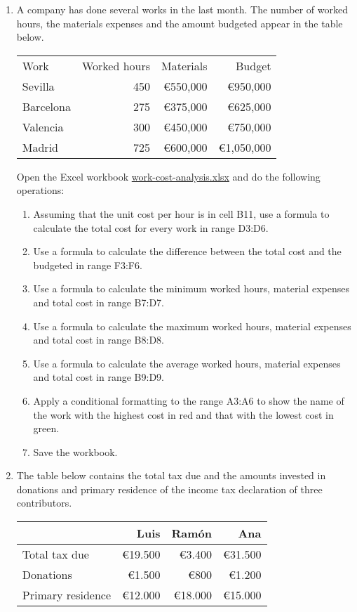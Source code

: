 \begin{enumerate}[leftmargin=*,resume]
\item A company has done several works in the last month. The number of worked hours, the materials expenses and the
amount budgeted appear in the table below.

\begin{center}
\begin{tabular}{lrrr}
\toprule
Work & Worked hours & Materials & Budget \\
Sevilla	  & 450	& €550,000 & €950,000\\ 
Barcelona &	275	& €375,000 & €625,000\\ 
Valencia  & 300 & €450,000 & €750,000\\ 
Madrid    & 725	& €600,000 & €1,050,000\\ 
\bottomrule
\end{tabular}
\end{center}

Open the Excel workbook
\href{http://aprendeconalf.es/office/excel/exercises/formulas/work-cost-analysis.xlsx}{\textsf{work-cost-analysis.xlsx}}
and do the following operations:

\begin{enumerate}
\item Assuming that the unit cost per hour is in cell B11, use a formula to calculate the total cost for every work in
range D3:D6.
\item Use a formula to calculate the difference between the total cost and the budgeted in range F3:F6.
\item Use a formula to calculate the minimum worked hours, material expenses and total cost in range B7:D7.
\item Use a formula to calculate the maximum worked hours, material expenses and total cost in range B8:D8.
\item Use a formula to calculate the average worked hours, material expenses and total cost in range B9:D9.
\item Apply a conditional formatting to the range A3:A6 to show the name of the work with the highest cost in red and
that with the lowest cost in green. 
\item Save the workbook. 
\end{enumerate}

\item The table below contains the total tax due and the amounts invested in donations and primary residence of the
income tax declaration of three contributors.
\begin{center}
\begin{tabular}{lrrr}
\toprule
 & Luis & Ramón & Ana\\
\midrule
Total tax due & €19.500 & €3.400 & €31.500\\
Donations & €1.500 & €800 & €1.200\\
Primary residence & €12.000 & €18.000 & €15.000\\
\bottomrule
\end{tabular}
\end{center}


\end{enumerate}
